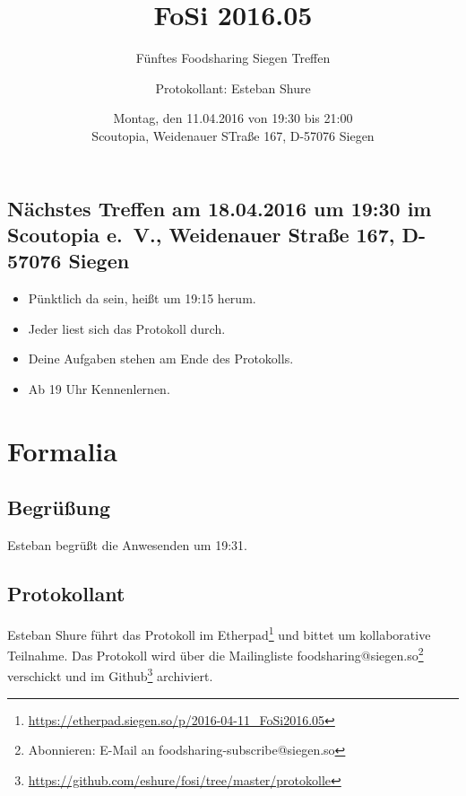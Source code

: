 \documentclass{scrreprt}
\begin{document}
\subject{Protokoll}
\title{FoSi 2016.05}
\subtitle{Fünftes Foodsharing Siegen Treffen}
\author{Protokollant: Esteban Shure}
\date{Montag, den 11.04.2016 von 19:30 bis 21:00\\Scoutopia, Weidenauer STraße 167, D-57076 Siegen}
\maketitle
\newpage
\tableofcontents
\newpage
\section{Nächstes Treffen am 18.04.2016 um 19:30 im Scoutopia e.~V., Weidenauer Straße 167, D-57076 Siegen}
	\begin{itemize}
		\item Pünktlich da sein, heißt um 19:15 herum.
		\item Jeder liest sich das Protokoll durch.
		\item Deine Aufgaben stehen am Ende des Protokolls.
		\item Ab 19 Uhr Kennenlernen.
	\end{itemize}
\chapter{Formalia}
\section{Begrüßung}
Esteban begrüßt die Anwesenden um 19:31.
\section{Protokollant}
Esteban Shure führt das Protokoll im Etherpad\footnote{\url{https://etherpad.siegen.so/p/2016-04-11_FoSi2016.05}} und bittet um kollaborative Teilnahme.
Das Protokoll wird über die Mailingliste foodsharing@siegen.so\footnote{Abonnieren: E-Mail an foodsharing-subscribe@siegen.so} verschickt und im Github\footnote{\url{https://github.com/eshure/fosi/tree/master/protokolle}} archiviert.
\end{document}
